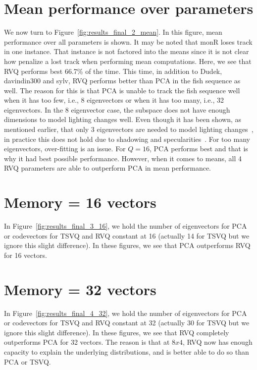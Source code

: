 \section{Mean performance over parameters}
We now turn to Figure~\ref{fig:results_final_2_mean}.  In this figure, mean performance over all parameters is shown.  It may be noted that monR loses track in one instance.  That instance is not factored into the means since it is not clear how penalize a lost track when performing mean computations.  Here, we see that RVQ performs best 66.7\% of the time.  This time, in addition to Dudek, davindin300 and sylv, RVQ performs better than PCA in the fish sequence as well.  The reason for this is that PCA is unable to track the fish sequence well when it has too few, i.e., 8 eigenvectors or when it has too many, i.e., 32 eigenvectors.  In the 8 eigenvector case, the subspace does not have enough dimensions to model lighting changes well.  Even though it has been shown, as mentioned earlier, that only 3 eigenvectors are needed to model lighting changes~\cite{1987_JNL_Faces_Sirovich}, in practice this does not hold due to shadowing and specularities~\cite{1997_JNL_EigenVsFisherFaces_Bel}.  For too many eigenvectors, over-fitting is an issue.  For $Q=16$, PCA performs best and that is why it had best possible performance.  However, when it comes to means, all 4 RVQ parameters are able to outperform PCA in mean performance.

\section{Memory = 16 vectors}
In Figure~\ref{fig:results_final_3_16}, we hold the number of eigenvectors for PCA or codevectors for TSVQ and RVQ constant at 16 (actually 14 for TSVQ but we ignore this slight difference).  In these figures, we see that PCA outperforms RVQ for 16 vectors.

\section{Memory = 32 vectors}
In Figure~\ref{fig:results_final_4_32}, we hold the number of eigenvectors for PCA or codevectors for TSVQ and RVQ constant at 32 (actually 30 for TSVQ but we ignore this slight difference).  In these figures, we see that RVQ completely outperforms PCA for 32 vectors.  The reason is that at $8x4$, RVQ now has enough capacity to explain the underlying distributions, and is better able to do so than PCA or TSVQ.


